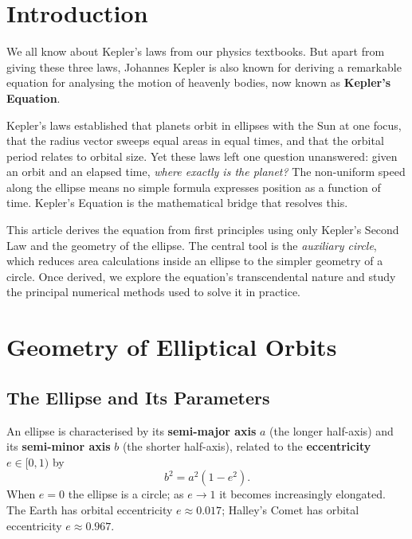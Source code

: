 \documentclass[12pt]{article}
\begin{document}
\section{Introduction}

We all know about Kepler's laws from our physics textbooks. But apart from giving
these three laws, Johannes Kepler is also known for deriving a remarkable equation
for analysing the motion of heavenly bodies, now known as \textbf{Kepler's Equation}.

Kepler's laws established that planets orbit in ellipses with the Sun at one focus,
that the radius vector sweeps equal areas in equal times, and that the orbital period
relates to orbital size. Yet these laws left one question unanswered: given an orbit
and an elapsed time, \emph{where exactly is the planet?} The non-uniform speed along
the ellipse means no simple formula expresses position as a function of time.
Kepler's Equation is the mathematical bridge that resolves this.

This article derives the equation from first principles using only Kepler's Second
Law and the geometry of the ellipse. The central tool is the \emph{auxiliary circle},
which reduces area calculations inside an ellipse to the simpler geometry of a circle.
Once derived, we explore the equation's transcendental nature and study the principal
numerical methods used to solve it in practice.

\section{Geometry of Elliptical Orbits}

\subsection{The Ellipse and Its Parameters}

An ellipse is characterised by its \textbf{semi-major axis} $a$ (the longer half-axis)
and its \textbf{semi-minor axis} $b$ (the shorter half-axis), related to the
\textbf{eccentricity} $e \in [0,1)$ by
\[
  b^2 = a^2(1 - e^2).
\]
When $e = 0$ the ellipse is a circle; as $e \to 1$ it becomes increasingly elongated.
The Earth has orbital eccentricity $e \approx 0.017$; Halley's Comet has orbital
eccentricity $e \approx 0.967$.
\end{document}
